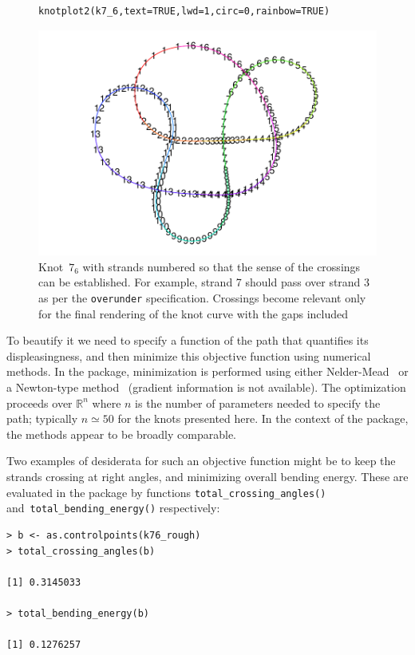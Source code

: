 \documentclass{birkjour}
\theoremstyle{definition}
\theoremstyle{remark}
\numberwithin{equation}{section}
\begin{document}
\begin{figure}[!tbp]
\begin{verbatim}
knotplot2(k7_6,text=TRUE,lwd=1,circ=0,rainbow=TRUE)
\end{verbatim}
 \centering
\includegraphics[scale = 0.9]{knot-004}
\caption{Knot~$7_6$ with strands numbered \label{k76_strands} so that
  the sense of the crossings can be established.  For example, strand
  7 should pass over strand 3 as per the {\tt overunder}
  specification.  Crossings become relevant only for the final
  rendering of the knot curve with the gaps included}
\end{figure}

To beautify it we need to specify a function of the path that
quantifies its displeasingness, and then minimize this objective
function using numerical methods.  In the package, minimization is
performed using either Nelder-Mead~\cite{nelder1965} or a Newton-type
method~\cite{dennis1983} (gradient information is not available).  The
optimization proceeds over $\mathbb{R}^n$ where $n$ is the number of
parameters needed to specify the path; typically $n\simeq 50$ for the
knots presented here.  In the context of the package, the methods
appear to be broadly comparable.

Two examples of desiderata for such an objective function might be to
keep the strands crossing at right angles, and minimizing overall bending
energy.  These are evaluated in the package by functions
{\tt total\_crossing\_angles()} and~{\tt total\_bending\_energy()}
respectively:

\begin{verbatim}
> b <- as.controlpoints(k76_rough)
> total_crossing_angles(b)

[1] 0.3145033

> total_bending_energy(b)

[1] 0.1276257
\end{verbatim}
\end{document}
